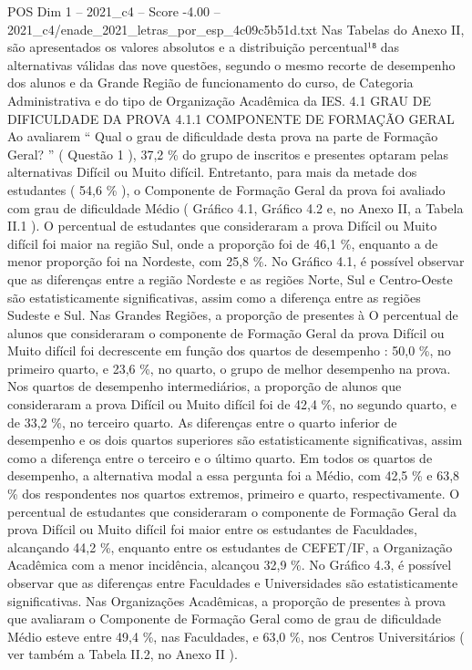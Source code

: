 \begin{textsample}{POS Dim 1 – 2021\_c4 – Score -4.00 – 2021\_c4/enade\_2021\_letras\_por\_esp\_4c09c5b51d.txt}
Nas Tabelas do Anexo II, são apresentados os valores absolutos e a distribuição percentual¹⁸ das alternativas válidas das nove questões, segundo o mesmo recorte de desempenho dos alunos e da Grande Região de funcionamento do curso, de Categoria Administrativa e do tipo de Organização Acadêmica da IES. 4.1 GRAU DE DIFICULDADE DA PROVA 4.1.1 COMPONENTE DE FORMAÇÃO GERAL Ao avaliarem “ Qual o grau de dificuldade desta prova na parte de Formação Geral? ” ( Questão 1 ), 37,2 \% do grupo de inscritos e presentes optaram pelas alternativas Difícil ou Muito difícil.
Entretanto, para mais da metade dos estudantes ( 54,6 \% ), o Componente de Formação Geral da prova foi avaliado com grau de dificuldade Médio ( Gráfico 4.1, Gráfico 4.2 e, no Anexo II, a Tabela II.1 ).
O percentual de estudantes que consideraram a prova Difícil ou Muito difícil foi maior na região Sul, onde a proporção foi de 46,1 \%, enquanto a de menor proporção foi na Nordeste, com 25,8 \%.
No Gráfico 4.1, é possível observar que as diferenças entre a região Nordeste e as regiões Norte, Sul e Centro-Oeste são estatisticamente significativas, assim como a diferença entre as regiões Sudeste e Sul.
Nas Grandes Regiões, a proporção de presentes à O percentual de alunos que consideraram o componente de Formação Geral da prova Difícil ou Muito difícil foi decrescente em função dos quartos de desempenho : 50,0 \%, no primeiro quarto, e 23,6 \%, no quarto, o grupo de melhor desempenho na prova.
Nos quartos de desempenho intermediários, a proporção de alunos que consideraram a prova Difícil ou Muito difícil foi de 42,4 \%, no segundo quarto, e de 33,2 \%, no terceiro quarto.
As diferenças entre o quarto inferior de desempenho e os dois quartos superiores são estatisticamente significativas, assim como a diferença entre o terceiro e o último quarto.
Em todos os quartos de desempenho, a alternativa modal a essa pergunta foi a Médio, com 42,5 \% e 63,8 \% dos respondentes nos quartos extremos, primeiro e quarto, respectivamente.
O percentual de estudantes que consideraram o componente de Formação Geral da prova Difícil ou Muito difícil foi maior entre os estudantes de Faculdades, alcançando 44,2 \%, enquanto entre os estudantes de CEFET/IF, a Organização Acadêmica com a menor incidência, alcançou 32,9 \%.
No Gráfico 4.3, é possível observar que as diferenças entre Faculdades e Universidades são estatisticamente significativas.
Nas Organizações Acadêmicas, a proporção de presentes à prova que avaliaram o Componente de Formação Geral como de grau de dificuldade Médio esteve entre 49,4 \%, nas Faculdades, e 63,0 \%, nos Centros Universitários ( ver também a Tabela II.2, no Anexo II ).

\end{textsample}
